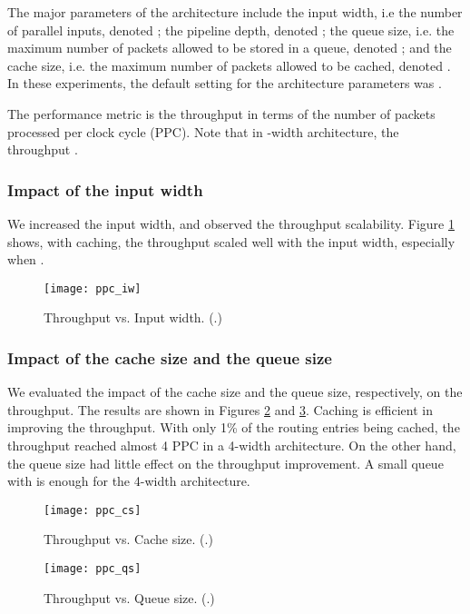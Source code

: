 \documentclass{sigcomm-alternate}
\begin{document}
The major parameters of the architecture include the input width, i.e the number of parallel inputs, denoted ; the pipeline depth, denoted ; the queue size, i.e. the maximum number of packets allowed to be stored in a queue, denoted ; and the cache size, i.e. the maximum number of packets allowed to be cached, denoted . In these experiments, the default setting for the architecture parameters was .

The performance metric is the throughput in terms of the number of packets processed per clock cycle (PPC). Note that in -width architecture, the throughput .


\subsubsection{Impact of the input width}

We increased the input width, and observed the throughput scalability. Figure \ref{fig:ppc_iw} shows, with caching, the throughput scaled well with the input width, especially when .
\begin{figure}[htb]
\centering
\texttt{[image: ppc\_iw]}
\caption{Throughput vs. Input width. (.)}
\label{fig:ppc_iw}
\end{figure}

\subsubsection{Impact of the cache size and the queue size}

We evaluated the impact of the cache size and the queue size, respectively, on the throughput. The results are shown in Figures \ref{fig:ppc_cs} and \ref{fig:ppc_qs}. Caching is efficient in improving the throughput. With only 1\% of the routing entries being cached, the throughput reached almost 4 PPC in a 4-width architecture. On the other hand, the queue size had little effect on the throughput improvement. A small queue with  is enough for the 4-width architecture. 

\begin{figure}[htb]
\centering
\texttt{[image: ppc\_cs]}
\caption{Throughput vs. Cache size. (.)}
\label{fig:ppc_cs}
\end{figure}

\begin{figure}[htb]
\centering
\texttt{[image: ppc\_qs]}
\caption{Throughput vs. Queue size. (.)}
\label{fig:ppc_qs}
\end{figure}
\end{document}
